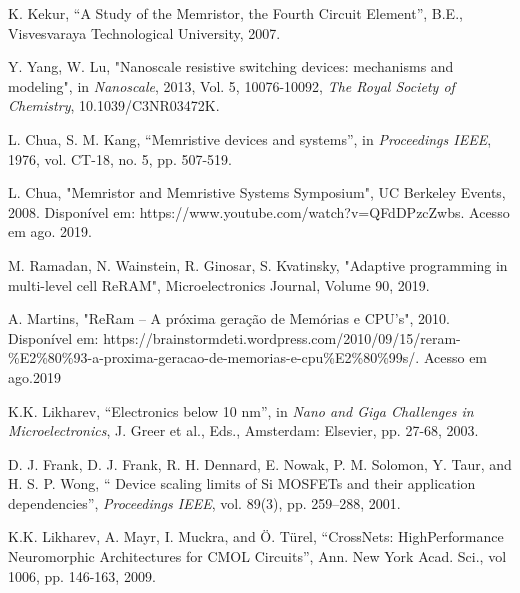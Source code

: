 \documentclass{ceel}
\begin{document}
\begin{multicols}{2}
\begin{thebibliography}{9}
    K. Kekur,
    “A Study of the Memristor, the Fourth Circuit Element”, 
   B.E., Visvesvaraya Technological University, 2007.

Y. Yang, W. Lu,
"Nanoscale resistive switching devices: mechanisms and modeling",
in \emph{Nanoscale},
2013, Vol. 5, 10076-10092, \emph{The Royal Society of Chemistry}, 10.1039/C3NR03472K. 

    L. Chua, S. M. Kang,
    “Memristive devices and systems”, 
    in \emph{Proceedings IEEE}, 1976, vol. CT-18, no. 5, pp. 507-519.

    L. Chua,
    "Memristor and Memristive Systems Symposium",  UC Berkeley Events, 2008.
    Disponível em: 
https://www.youtube.com/watch?v=QFdDPzcZwbs. Acesso em ago. 2019.


    M. Ramadan, N. Wainstein, R. Ginosar, S. Kvatinsky, 
   "Adaptive programming in multi-level cell ReRAM", Microelectronics Journal, Volume 90, 2019. %
    
     A. Martins, 
	"ReRam – A próxima geração de Memórias e CPU’s", 2010. 
	Disponível em: 
https://brainstormdeti.wordpress.com/2010/09/15/reram-\%E2\%80\%93-a-proxima-geracao-de-memorias-e-cpu\%E2\%80\%99s/. Acesso em ago.2019

K.K. Likharev, “Electronics below 10 nm”, in \emph{Nano and Giga Challenges in Microelectronics}, J. Greer et al., Eds., Amsterdam: Elsevier, pp. 27-68, 2003.

D. J. Frank, D. J. Frank, R. H. Dennard, E. Nowak, P. M. Solomon, Y. Taur, and H. S. P. Wong, 
“ Device scaling limits of Si MOSFETs and their application dependencies”, 
\emph{Proceedings IEEE}, vol. 89(3), pp. 259–288, 2001.

K.K. Likharev, A. Mayr, I. Muckra, and Ö. Türel, 
“CrossNets: HighPerformance Neuromorphic Architectures for CMOL Circuits”, Ann. New York Acad. Sci., vol 1006, pp. 146-163, 2009.

\end{thebibliography}

\end{multicols}
\end{document}
